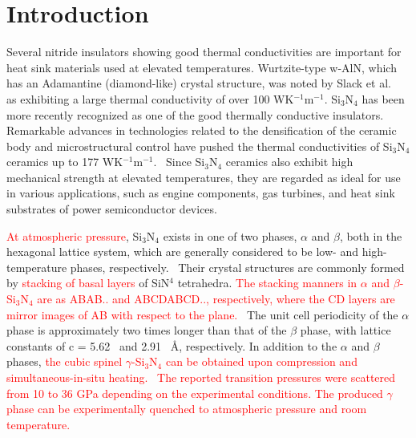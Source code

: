 \documentclass[twocolumn,amsmath,amssymb,a4paper,prb,superscriptaddress,floatfix]{revtex4-1}
\begin{document}
\maketitle

\section{Introduction}
Several nitride insulators showing good thermal conductivities are
important for heat sink materials used at elevated
temperatures. Wurtzite-type w-AlN, which has an Adamantine
(diamond-like) crystal structure, was noted by Slack et al.~\cite{slack} as
exhibiting a large thermal conductivity of over 100 WK$^{-1}$m$^{-1}$.
Si$_3$N$_4$ has been more recently recognized as one of the good
thermally conductive insulators. Remarkable advances in technologies
related to the densification of the ceramic body and microstructural
control have pushed the thermal conductivities of Si$_3$N$_4$ ceramics
up to 177 WK$^{-1}$m$^{-1}$.~\cite{zhou,hirao,watari,hirosaki} Since Si$_3$N$_4$ ceramics also exhibit
high mechanical strength at elevated temperatures, they are regarded as
ideal for use in various applications, such as engine components, gas
turbines, and heat sink substrates of power semiconductor devices.

\textcolor{red}{At atmospheric pressure}, Si$_3$N$_4$ exists in one of
two phases, $\alpha$ and $\beta$, both in the hexagonal lattice system,
which are generally considered to be low- and high-temperature phases,
respectively.~\cite{zhou,hirosaki,riley} Their crystal structures are commonly formed by
%
\textcolor{red}{stacking of basal layers}
%
of SiN$^4$ tetrahedra.
%
\textcolor{red}{The stacking manners in $\alpha$ and
$\beta$-Si$_3$N$_4$ are as ABAB.. and ABCDABCD.., respectively, where
the CD layers are mirror images of AB with respect to the plane.~\cite{hampshire}}
%
The unit cell periodicity of the $\alpha$ phase is approximately two
times longer than that of the $\beta$ phase, with lattice constants of c
= 5.62~\cite{yashima} and 2.91~\cite{boulay} \AA, respectively. In addition to the $\alpha$ and
$\beta$ phases,
%
\textcolor{red}{the cubic spinel $\gamma$-Si$_3$N$_4$ can be obtained
	upon compression and simultaneous-in-situ heating.~\cite{zerr,zhang} The reported
transition pressures were scattered from 10 to 36 GPa depending on the
experimental conditions. The produced $\gamma$ phase can be
experimentally quenched to atmospheric pressure and room temperature.}
\end{document}
